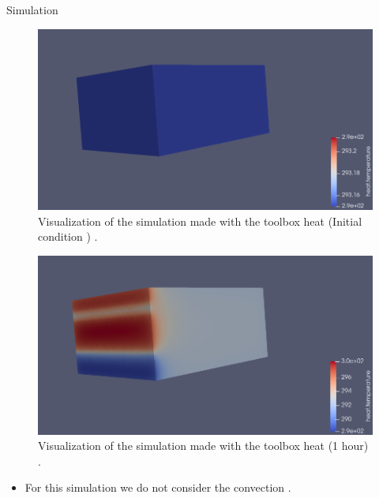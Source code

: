 \begin{frame}[allowframebreaks]{Simulation}
\begin{minipage}{0.47\linewidth}
    \begin{figure}
        \centering
        \includegraphics[width=\linewidth]{"images/enkf/sim_1.png"}
        \caption{Visualization of the simulation made with the toolbox heat (Initial condition ) .}
    \end{figure}
\end{minipage} \;
\begin{minipage}{0.48\linewidth}
    \begin{figure}
        \centering
        \includegraphics[width=\linewidth]{"images/enkf/sim_2.png"}
        \caption{Visualization of the simulation made with the toolbox heat (1 hour) .}
    \end{figure}
\end{minipage}
\begin{itemize}
    \item For this simulation we do not consider the convection .
\end{itemize}

\end{frame}
    
